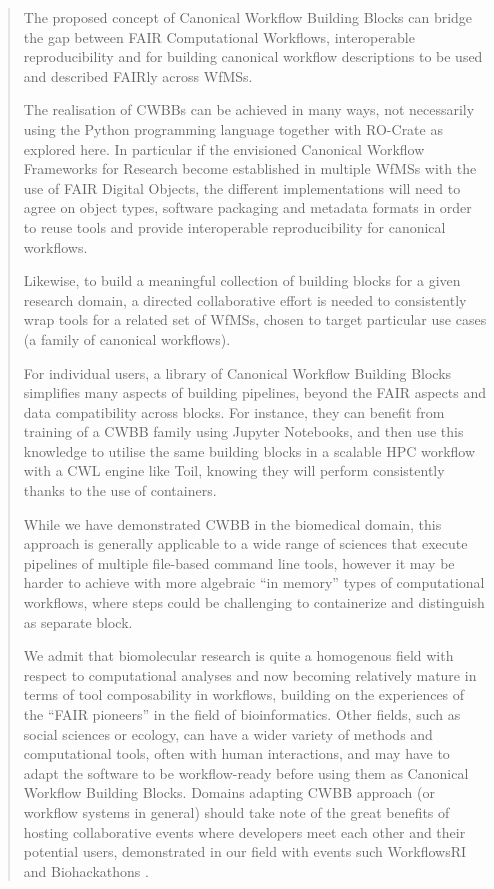 \begin{quotation} 
  The proposed concept of Canonical Workflow Building Blocks can bridge
  the gap between FAIR Computational Workflows, interoperable
  reproducibility and for building canonical workflow descriptions to be
  used and described FAIRly across WfMSs.

  The realisation of CWBBs can be achieved in many ways, not necessarily
  using the Python programming language together with RO-Crate as explored
  here.
  In particular if the envisioned Canonical Workflow Frameworks for
  Research become established in multiple WfMSs with the use of FAIR
  Digital Objects, the different implementations will need to agree on
  object types, software packaging and metadata formats in order to reuse
  tools and provide interoperable reproducibility for canonical workflows.

  Likewise, to build a meaningful collection of building blocks for a
  given research domain, a directed collaborative effort is needed to
  consistently wrap tools for a related set of WfMSs, chosen to target
  particular use cases (a family of canonical workflows).

  For individual users, a library of Canonical Workflow Building Blocks
  simplifies many aspects of building pipelines, beyond the FAIR aspects
  and data compatibility across blocks.
  For instance, they can benefit
  from training of a CWBB family using Jupyter Notebooks, and then use
  this knowledge to utilise the same building blocks in a scalable HPC
  workflow with a CWL engine like Toil, knowing they will perform
  consistently thanks to the use of containers.

  While we have demonstrated CWBB in the biomedical domain, this approach
  is generally applicable to a wide range of sciences that execute
  pipelines of multiple file-based command line tools, however it may be
  harder to achieve with more algebraic ``in memory'' types of
  computational workflows, where steps could be challenging to
  containerize and distinguish as separate block.

  We admit that biomolecular research is quite a homogenous field with
  respect to computational analyses and now becoming relatively mature in
  terms of tool composability in workflows, building on the experiences of
  the ``FAIR pioneers'' in the field of bioinformatics.
  Other fields, such
  as social sciences or ecology, can have a wider variety of methods and
  computational tools, often with human interactions, and may have to
  adapt the software to be workflow-ready \cite{ch6-37} before using them as
  Canonical Workflow Building Blocks.
  Domains adapting CWBB approach (or
  workflow systems in general) should take note of the great benefits of
  hosting collaborative events where developers meet each other and their
  potential users, demonstrated in our field with events such WorkflowsRI
  \cite{ch6-39} and Biohackathons \cite{ch6-40}.


\end{quotation}
